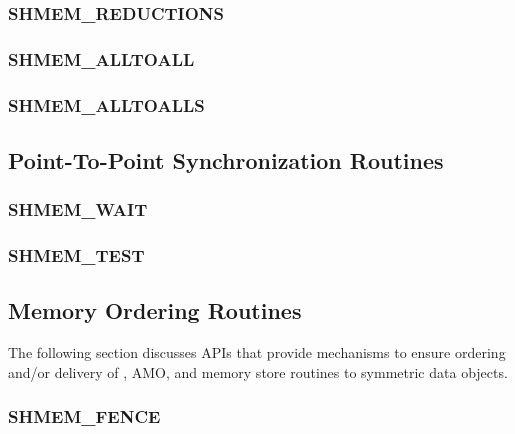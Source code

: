 \documentclass[10pt]{book}
\begin{document}
\subsubsection{\textbf{SHMEM\_REDUCTIONS}}\label{subsec:shmem_reductions}


\subsubsection{\textbf{SHMEM\_ALLTOALL}}\label{subsec:shmem_alltoall}


\subsubsection{\textbf{SHMEM\_ALLTOALLS}}\label{subsec:shmem_alltoalls}






\subsection{Point-To-Point Synchronization Routines}\label{subsec:p2p_intro}


\subsubsection{\textbf{SHMEM\_WAIT}}\label{subsec:shmem_wait}


\subsubsection{\textbf{SHMEM\_TEST}}\label{subsec:shmem_test}






\subsection{Memory Ordering Routines}\label{subsec:memory_order}
The following section discusses \openshmem \acp{API} that provide mechanisms to
ensure ordering and/or delivery of , \ac{AMO}, and memory store
routines to symmetric data objects. 

\subsubsection{\textbf{SHMEM\_FENCE}}\label{subsec:shmem_fence}

\end{document}
